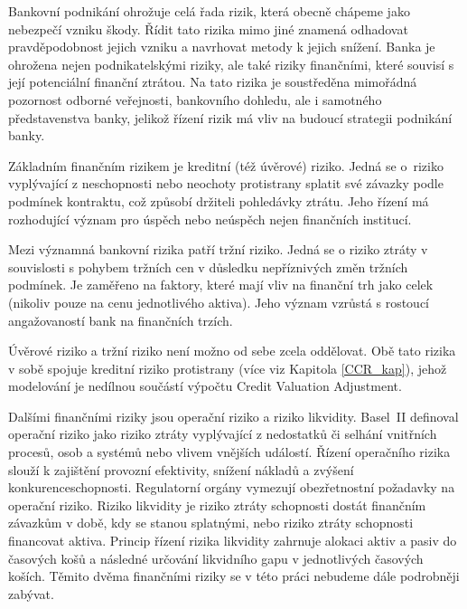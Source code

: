 \documentclass[a4paper,12pt]{report}
\theoremstyle{definition} \newtheorem{definice}[veta]{Definice}
\theoremstyle{remark}
\begin{document}
Bankovní podnikání ohrožuje celá řada rizik, která obecně chápeme jako nebezpečí vzniku škody. 
Řídit tato rizika mimo jiné znamená odhadovat pravděpodobnost jejich vzniku a navrhovat metody k jejich snížení.
Banka je ohrožena nejen podnikatelskými riziky, ale také riziky finančními, které souvisí s její potenciální finanční ztrátou. 
Na tato rizika je soustředěna mimořádná pozornost odborné veřejnosti, bankovního dohledu, ale i samotného představenstva banky, jelikož řízení rizik má vliv na budoucí strategii podnikání banky.

Základním finančním rizikem je kreditní (též úvěrové) riziko.
Jedná se o~riziko vyplývající z neschopnosti nebo neochoty protistrany splatit své závazky podle podmínek
kontraktu, což způsobí držiteli pohledávky ztrátu.
Jeho řízení má rozhodující význam pro úspěch nebo neúspěch nejen finančních institucí. 

Mezi významná bankovní rizika patří tržní riziko. 
Jedná se o riziko ztráty v souvislosti s pohybem tržních cen v důsledku nepříznivých změn tržních podmínek. 
Je zaměřeno na faktory, které mají vliv na finanční trh jako celek (nikoliv pouze na cenu jednotlivého aktiva).
Jeho význam vzrůstá s rostoucí angažovaností bank na finančních trzích. 

Úvěrové riziko a tržní riziko není možno od sebe zcela oddělovat.
Obě tato rizika v sobě spojuje kreditní riziko protistrany (více viz Kapitola \ref{CCR_kap}), jehož modelování je nedílnou součástí výpočtu Credit Valuation Adjustment. 

Dalšími finančními riziky jsou operační riziko a riziko likvidity.
Basel~II %
definoval operační riziko jako riziko ztráty vyplývající z nedostatků či selhání vnitřních procesů, osob a systémů nebo vlivem vnějších událostí.
Řízení operačního rizika slouží k zajištění provozní efektivity, snížení nákladů a zvýšení konkurenceschopnosti.
Regulatorní orgány vymezují obezřetnostní požadavky na operační riziko.
Riziko likvidity je %
riziko ztráty schopnosti dostát finančním závazkům v době, kdy se stanou splatnými, nebo riziko ztráty schopnosti financovat aktiva.
Princip řízení rizika likvidity zahrnuje alokaci aktiv a pasiv do časových košů a následné určování likvidního gapu v jednotlivých časových koších. 
Těmito dvěma finančními riziky se v této práci nebudeme dále podrobněji zabývat.
\end{document}
